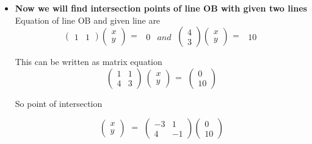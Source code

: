 \documentclass[11pt]{beamer}
\begin{document}
\begin{frame}
\begin{itemize}
\item \textbf{Now we will find intersection points of line OB with given two lines}
Equation of line OB and given line are
\[\left(\begin{array}{cc}
1 & 1
\end{array}\right)
%
\left(\begin{array}{cc}
x\\
y
\end{array}\right)
\begin{matrix}
=
\end{matrix}
\
%
\begin{matrix}
0
\end{matrix}
\begin{matrix}
and
\end{matrix}
\
\left(\begin{array}{cc}
4\\
3
\end{array}\right)
\left(\begin{array}{cc}
x\\
y
\end{array}\right)
\begin{matrix}
=
\end{matrix}
\
%
\begin{matrix}
10
\end{matrix}
\]

This can be written as matrix equation
\[\left(\begin{array}{cc}
1 & 1\\
4 & 3
\end{array}\right)
\
%
\left(\begin{array}{cc}
x\\ 
y
\end{array}\right)
\begin{matrix}
=
\end{matrix}
\
%
\left(\begin{array}{cc}
0\\ 
10
\end{array}\right)
\]

So point of intersection 

\[\left(\begin{array}{cc}
x\\
y
\end{array}\right)
\
\begin{matrix}
=
\end{matrix}
\
\left(\begin{array}{cc}
-3 & 1\\ 
4 & -1
\end{array}\right)
\left(\begin{array}{cc}
0\\ 
10
\end{array}\right)
\]


\end{itemize}
\end{frame}
\end{document}

